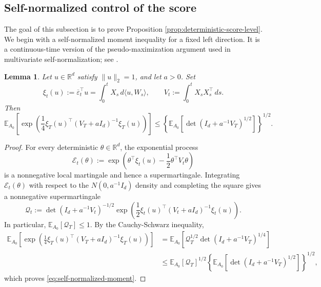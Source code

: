 \documentclass[11pt]{article}
\newtheorem{lemma}[theorem]{Lemma}
\begin{document}
\subsection{Self-normalized control of the score}
\label{subsec:score-control}

The goal of this subsection is to prove Proposition \ref{prop:deterministic-score-level}.
We begin with a self-normalized moment inequality for a fixed left direction.
It is a continuous-time version of the pseudo-maximization argument used in
multivariate self-normalization; see \cite{DeLaPenaKlassLai2009}.

\begin{lemma}%
\label{lem:self-normalized-moment}
Let $u\in\mathbb R^d$ satisfy $\|u\|_2=1$, and let $a>0$. Set
\[
    \xi_t(u):=\overline\varepsilon_t^\top u
    =\int_0^t X_s\,d\langle u,W_s\rangle,
    \qquad
    V_t:=\int_0^t X_sX_s^\top\,ds.
\]
Then
\begin{equation}
    \mathbb E_{A_0}\!\left[
        \exp\!\left(
            \frac14 \xi_T(u)^\top(V_T+aI_d)^{-1}\xi_T(u)
        \right)
    \right]
    \leq
    \left\{
        \mathbb E_{A_0}\!\left[
            \det\!\left(I_d+a^{-1}V_T\right)^{1/2}
        \right]
    \right\}^{1/2}.
\label{eq:self-normalized-moment}
\end{equation}
\end{lemma}

\begin{proof}
For every deterministic $\theta\in\mathbb R^d$, the exponential process
\[
    \mathcal E_t(\theta)
    :=\exp\!\left(
        \theta^\top \xi_t(u)-\frac12\theta^\top V_t\theta
    \right)
\]
is a nonnegative local martingale and hence a supermartingale. Integrating
$\mathcal E_t(\theta)$ with respect to the $N(0,a^{-1}I_d)$ density and
completing the square gives a nonnegative supermartingale
\[
    \mathcal Q_t
    :=
    \det\!\left(I_d+a^{-1}V_t\right)^{-1/2}
    \exp\!\left(
        \frac12 \xi_t(u)^\top(V_t+aI_d)^{-1}\xi_t(u)
    \right).
\]
In particular, $\mathbb E_{A_0}[\mathcal Q_T]\leq1$. By the Cauchy-Schwarz
inequality,
\begin{align*}
    \mathbb E_{A_0}\!\left[
        \exp\!\left(
            \frac14 \xi_T(u)^\top(V_T+aI_d)^{-1}\xi_T(u)
        \right)
    \right]
    &=
    \mathbb E_{A_0}\!\left[
        \mathcal Q_T^{1/2}
        \det\!\left(I_d+a^{-1}V_T\right)^{1/4}
    \right] \\
    &\leq
    \mathbb E_{A_0}[\mathcal Q_T]^{1/2}
    \left\{
        \mathbb E_{A_0}\!\left[
            \det\!\left(I_d+a^{-1}V_T\right)^{1/2}
        \right]
    \right\}^{1/2},
\end{align*}
which proves \eqref{eq:self-normalized-moment}.
\end{proof}
\end{document}
